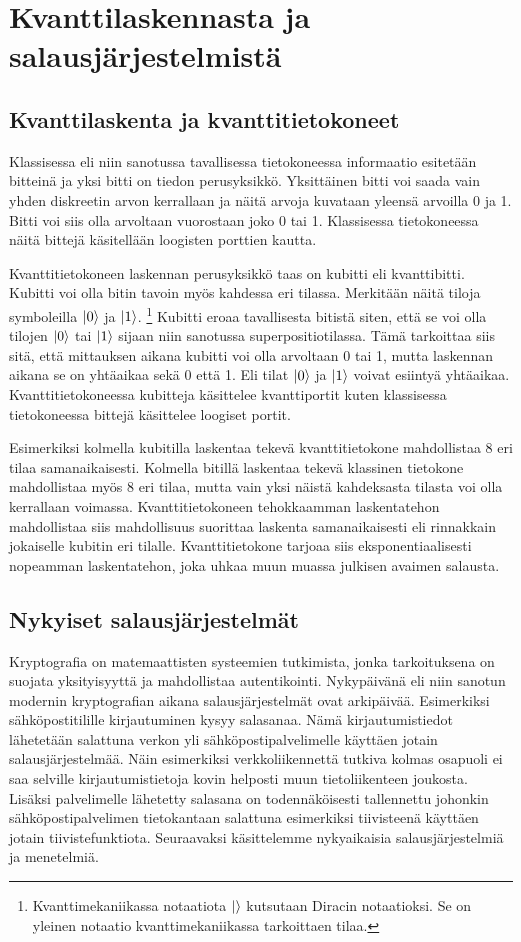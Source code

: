 \chapter{Kvanttilaskennasta ja salausjärjestelmistä\label{methods}}

\section{Kvanttilaskenta ja kvanttitietokoneet}
Klassisessa eli niin sanotussa tavallisessa tietokoneessa informaatio esitetään bitteinä ja yksi bitti on tiedon perusyksikkö. Yksittäinen bitti voi saada vain yhden diskreetin arvon kerrallaan ja näitä arvoja kuvataan yleensä arvoilla 0 ja 1. Bitti voi siis olla arvoltaan vuorostaan joko 0 tai 1. Klassisessa tietokoneessa näitä bittejä käsitellään loogisten porttien kautta.

Kvanttitietokoneen laskennan perusyksikkö taas on kubitti eli kvanttibitti. Kubitti voi olla bitin tavoin myös kahdessa eri tilassa. Merkitään näitä tiloja symboleilla
$\ket{0}$ ja $\ket{1}$. \footnote{Kvanttimekaniikassa notaatiota $\ket{}$ kutsutaan Diracin notaatioksi. Se on yleinen notaatio kvanttimekaniikassa tarkoittaen tilaa.} Kubitti eroaa tavallisesta bitistä siten, että se voi olla tilojen $\ket{0}$ tai $\ket{1}$ sijaan niin sanotussa superpositiotilassa. Tämä tarkoittaa siis sitä, että mittauksen aikana kubitti voi olla arvoltaan 0 tai 1, mutta laskennan aikana se on yhtäaikaa sekä 0 että 1. Eli tilat $\ket{0}$ ja $\ket{1}$ voivat esiintyä yhtäaikaa. Kvanttitietokoneessa kubitteja käsittelee kvanttiportit kuten klassisessa tietokoneessa bittejä käsittelee loogiset portit.

Esimerkiksi kolmella kubitilla laskentaa tekevä kvanttitietokone mahdollistaa 8 eri tilaa samanaikaisesti. Kolmella bitillä laskentaa tekevä klassinen tietokone mahdollistaa myös 8 eri tilaa, mutta vain yksi näistä kahdeksasta tilasta voi olla kerrallaan voimassa. Kvanttitietokoneen tehokkaamman laskentatehon mahdollistaa siis mahdollisuus suorittaa laskenta samanaikaisesti eli rinnakkain jokaiselle kubitin eri tilalle. Kvanttitietokone tarjoaa siis eksponentiaalisesti nopeamman laskentatehon, joka uhkaa muun muassa julkisen avaimen salausta.

\section{Nykyiset salausjärjestelmät}
Kryptografia on matemaattisten systeemien tutkimista, jonka tarkoituksena on suojata yksityisyyttä ja mahdollistaa autentikointi. Nykypäivänä eli niin sanotun modernin kryptografian aikana salausjärjestelmät ovat arkipäivää. Esimerkiksi sähköpostitilille kirjautuminen kysyy salasanaa. Nämä kirjautumistiedot lähetetään salattuna verkon yli sähköpostipalvelimelle käyttäen jotain salausjärjestelmää. Näin esimerkiksi verkkoliikennettä tutkiva kolmas osapuoli ei saa selville kirjautumistietoja kovin helposti muun tietoliikenteen joukosta. Lisäksi palvelimelle lähetetty salasana on todennäköisesti tallennettu johonkin sähköpostipalvelimen tietokantaan salattuna esimerkiksi tiivisteenä käyttäen jotain tiivistefunktiota. Seuraavaksi käsittelemme nykyaikaisia salausjärjestelmiä ja menetelmiä.

